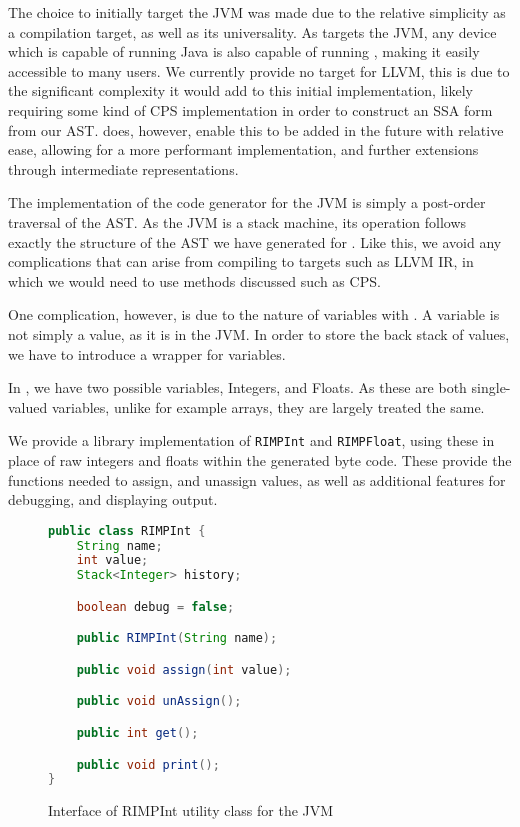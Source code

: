 The choice to initially target the JVM was made due to the relative simplicity as a compilation target, as well as its universality. As \rimp targets the JVM, any device which is capable of running Java is also capable of running \rimp, making it easily accessible to many users. 
We currently provide no target for LLVM, this is due to the significant complexity it would add to this initial implementation, likely requiring some kind of CPS implementation in order to construct an SSA form from our AST\cite{ComputingSSA}. \rimp does, however, enable this to be added in the future with relative ease, allowing for a more performant implementation, and further extensions through intermediate representations.

The implementation of the code generator for the JVM is simply a post-order traversal of the AST. 
As the JVM is a stack machine, its operation follows exactly the structure of the AST we have generated for \rimplang. Like this, we avoid any complications that can arise from compiling to targets such as LLVM IR, in which we would need to use methods discussed such as CPS. 

One complication, however, is due to the nature of variables with \rimplang. A variable is not simply a value, as it is in the JVM. In order to store the back stack of values, we have to introduce a wrapper for variables.

In \rimp, we have two possible variables, Integers, and Floats. As these are both single-valued variables, unlike for example arrays, they are largely treated the same.

We provide a library implementation of \lstinline{RIMPInt} and \lstinline{RIMPFloat}, using these in place of raw integers and floats within the generated byte code. These provide the functions needed to assign, and unassign values, as well as additional features for debugging, and displaying output.

\begin{figure}[ht]
    \centering
    \begin{lstlisting}[language=java,label={lst:RIMPInt},basicstyle=\small]
public class RIMPInt {
    String name;
    int value;
    Stack<Integer> history;

    boolean debug = false;

    public RIMPInt(String name);

    public void assign(int value);

    public void unAssign();

    public int get();

    public void print();
}
    \end{lstlisting}
    \caption{Interface of RIMPInt utility class for the JVM}
    \label{fig:RIMPInt}
\end{figure}

